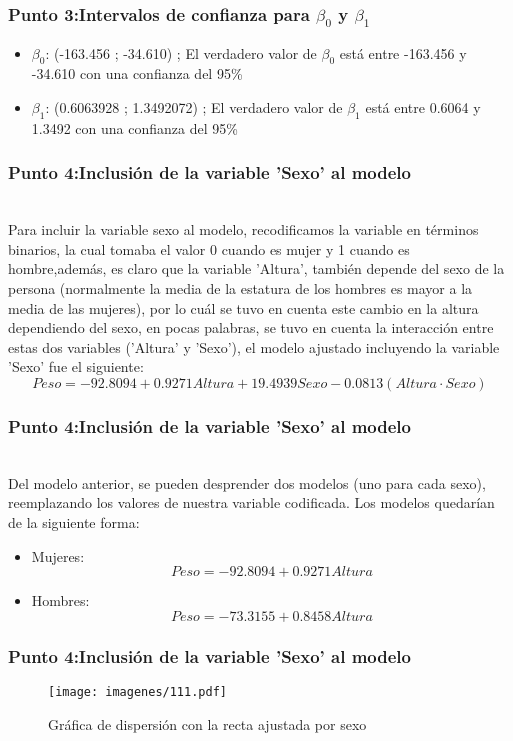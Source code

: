 \documentclass[12pt]{beamer}
\begin{document}
\begin{frame}
\frametitle{Punto 3:Intervalos de confianza para $\beta_{0}$ y $\beta_{1}$}
\begin{itemize}
\item $\beta_{0}$: (-163.456 ; -34.610)  ; El verdadero valor de $\beta_{0}$ está entre -163.456 y -34.610 con una confianza del 95\%
\item $\beta_{1}$: (0.6063928 ; 1.3492072) ; El verdadero valor de $\beta_{1}$ está entre 0.6064 y 1.3492 con una confianza del 95\%
\end{itemize}

\end{frame}
\begin{frame}
\frametitle{Punto 4:Inclusión de la variable 'Sexo' al modelo}
~\\ Para incluir la variable sexo al modelo, recodificamos la variable en términos binarios, la cual tomaba el valor 0 cuando es mujer y 1 cuando es hombre,además, es claro que la variable 'Altura', también depende del sexo de la persona (normalmente la media de la estatura de los hombres es mayor a la media de las mujeres), por lo cuál se tuvo en cuenta este cambio en la altura dependiendo del sexo, en pocas palabras, se tuvo en cuenta la interacción entre estas dos variables ('Altura' y 'Sexo'), el modelo ajustado incluyendo la variable 'Sexo' fue el siguiente:
~\\ $$Peso=-92.8094+0.9271 Altura+ 19.4939 Sexo -0.0813(Altura\cdot Sexo)$$
\end{frame}
\begin{frame}
\frametitle{Punto 4:Inclusión de la variable 'Sexo' al modelo}
~\\ Del modelo anterior, se pueden desprender dos modelos (uno para cada sexo), reemplazando los valores de nuestra variable codificada. Los modelos quedarían de la siguiente forma:
\begin{itemize}
\item Mujeres: $$Peso=-92.8094+0.9271 Altura$$
\item Hombres: $$Peso=-73.3155+0.8458 Altura$$
\end{itemize}
\end{frame}
\begin{frame}
\frametitle{Punto 4:Inclusión de la variable 'Sexo' al modelo}
\begin{figure}[!h]
    \begin{center}
        \texttt{[image: imagenes/111.pdf]}
        \caption{Gráfica de dispersión con la recta ajustada por sexo}
        \label{fig:Densidad}
    \end{center}
\end{figure}
\end{frame}
\end{document}
